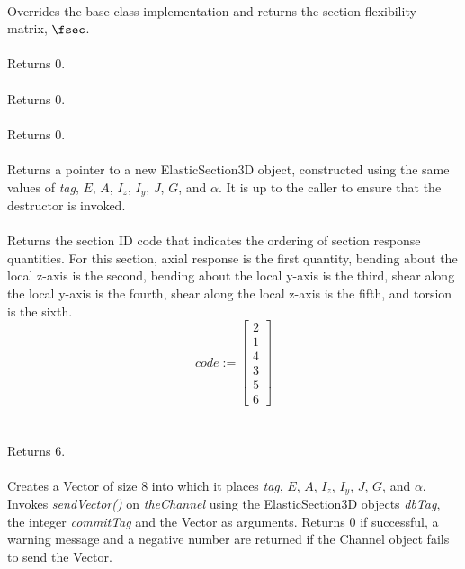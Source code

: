  \\
Overrides the base class implementation and returns the section
flexibility matrix, $\fsec$. \\

 \\
Returns $0$. \\

 \\
Returns $0$. \\

 \\
Returns $0$. \\

 \\
Returns a pointer to a new ElasticSection3D object, constructed
using the same values of {\em tag}, $E$, $A$, $I_z$, $I_y$, $J$, $G$, and $\alpha$.
It is up to the caller to ensure that the destructor is invoked. \\

 \\
Returns the section ID code that indicates the ordering of
section response quantities. For this section, axial response is the
first quantity, bending about the local z-axis is the second, bending about
the local y-axis is the third, shear along the local y-axis is the fourth,
shear along the local z-axis is the fifth, and torsion is the sixth. \\

\begin{equation}
code := \left[
   \begin{array}{c}
       2 \\
       1 \\
       4 \\
       3 \\
       5 \\
       6
   \end{array} 
 \right]
\end{equation} \\

 \\
Returns 6. \\

\\
Creates a Vector of size $8$ into which it places  {\em tag},
$E$, $A$, $I_z$, $I_y$, $J$, $G$, and $\alpha$. Invokes {\em sendVector()} on 
{\em theChannel} using the ElasticSection3D objects {\em dbTag}, the integer
{\em commitTag} and the Vector as arguments. Returns $0$ if successful, a warning
message and a negative number are returned if the Channel object fails to send
the Vector. \\

